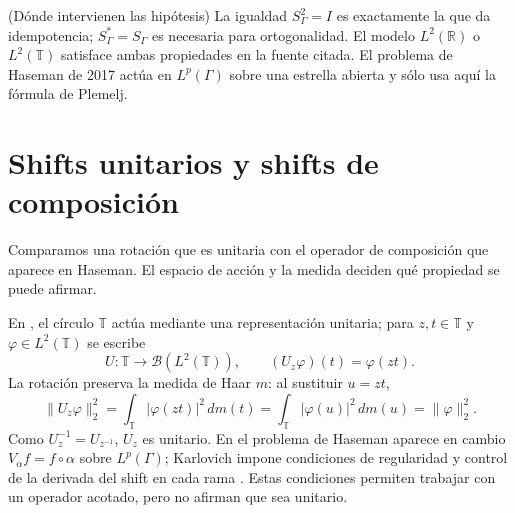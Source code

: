 \begin{cthnota}{(Dónde intervienen las hipótesis)}
La igualdad $S_\Gamma^2=I$ es exactamente la que da idempotencia;
$S_\Gamma^*=S_\Gamma$ es necesaria para ortogonalidad. El modelo
$L^2(\mathbb R)$ o $L^2(\mathbb T)$ satisface ambas propiedades en la
fuente citada. El problema de Haseman de 2017 actúa en $L^p(\Gamma)$
sobre una estrella abierta y sólo usa aquí la fórmula de Plemelj.
\end{cthnota}

\section{Shifts unitarios y shifts de composición}

Comparamos una rotación que es unitaria con el operador de composición
que aparece en Haseman. El espacio de acción y la medida deciden qué
propiedad se puede afirmar.

En \cite[§1, p.~20]{BFK2006}, el círculo $\mathbb T$ actúa mediante una representación unitaria;
para $z,t\in\mathbb T$ y $\varphi\in L^2(\mathbb T)$ se escribe
\[
 U:\mathbb T\to\mathcal B(L^2(\mathbb T)),
 \qquad
 (U_z\varphi)(t)=\varphi(zt).
\]
La rotación preserva la medida de Haar $m$: al sustituir $u=zt$,
\[
 \|U_z\varphi\|_2^2=\int_{\mathbb T}|\varphi(zt)|^2\,dm(t)
 =\int_{\mathbb T}|\varphi(u)|^2\,dm(u)=\|\varphi\|_2^2.
\]
Como $U_z^{-1}=U_{z^{-1}}$, $U_z$ es unitario. En el problema de Haseman aparece en cambio
$V_\alpha f=f\circ\alpha$ sobre $L^p(\Gamma)$; Karlovich impone condiciones
de regularidad y control de la derivada del shift en cada rama
\cite[§2, p.~467]{Karlovich2017}. Estas condiciones permiten trabajar con
un operador acotado, pero no afirman que sea unitario.

\begin{center}
\end{center}

